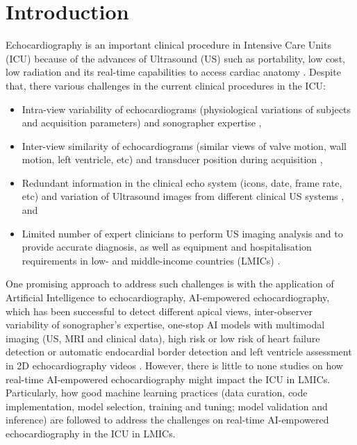 \documentclass[mlabstract,twocolumn]{jmlr}
\begin{document}
\section{Introduction}
\label{sec:intro}
Echocardiography is an important clinical procedure in Intensive Care Units (ICU) because of the advances of Ultrasound (US) such as portability, low cost, low radiation and its real-time capabilities to access cardiac anatomy \citep{Feigenbaum1996, Vieillard-Baron2008, singh2007, cambell2018}.
Despite that, there various challenges in the current clinical procedures in the ICU:
\begin{itemize}
\setlength\itemsep{0em}
\item Intra-view variability of echocardiograms (physiological variations of subjects and acquisition parameters) and sonographer expertise \citep{khamis2017, Feigenbaum1996, field2011},
\item Inter-view similarity of echocardiograms (similar views of valve motion, wall motion, left ventricle, etc) and transducer position during acquisition \citep{zhang2018},
\item Redundant information in the clinical echo system (icons, date, frame rate, etc) \citep{khamis2017} and variation of Ultrasound images from different clinical US systems \citep{brindise2020unsupervised}, and
\item Limited number of expert clinicians to perform US imaging analysis and to provide accurate diagnosis, as well as equipment and hospitalisation requirements in low- and middle-income countries (LMICs) \citep{hao2021-wellcome, 2021-huyNhat-vanHao-in-FAIR-MICCAI}.
\end{itemize}
One promising approach to address such challenges is with the application of Artificial Intelligence to echocardiography, AI-empowered echocardiography, which has been successful to detect different apical views, inter-observer variability of sonographer's expertise, one-stop AI models with multimodal imaging (US, MRI and clinical data), high risk or low risk of heart failure detection or automatic endocardial border detection and left ventricle assessment in 2D echocardiography videos \citep{tromp2022, zhang2022-mdpi, behnami2020, ono2022}.
However, there is little to none studies on how real-time AI-empowered echocardiography might impact the ICU in LMICs.
Particularly, how good machine learning practices (data curation, code implementation, model selection, training and tuning; model validation and inference) are followed to address the challenges on real-time AI-empowered echocardiography in the ICU in LMICs.
\end{document}
